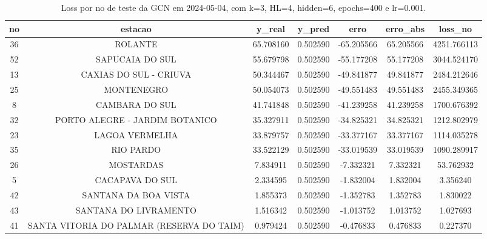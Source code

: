 \begin{table}[h]
\centering
\caption{Loss por no de teste da GCN em 2024-05-04, com k=3, HL=4, hidden=6, epochs=400 e lr=0.001.}
\label{tab:gcn_loss_k3_hl4_h6_e400_d20240504}
\begin{tabular}{ccccccc}
\toprule
no & estacao & y\_real & y\_pred & erro & erro\_abs & loss\_no \\
\midrule
36 & ROLANTE & 65.708160 & 0.502590 & -65.205566 & 65.205566 & 4251.766113 \\
52 & SAPUCAIA DO SUL & 55.679798 & 0.502590 & -55.177208 & 55.177208 & 3044.524170 \\
13 & CAXIAS DO SUL - CRIUVA & 50.344467 & 0.502590 & -49.841877 & 49.841877 & 2484.212646 \\
25 & MONTENEGRO & 50.054073 & 0.502590 & -49.551483 & 49.551483 & 2455.349365 \\
8 & CAMBARA DO SUL & 41.741848 & 0.502590 & -41.239258 & 41.239258 & 1700.676392 \\
32 & PORTO ALEGRE - JARDIM BOTANICO & 35.327911 & 0.502590 & -34.825321 & 34.825321 & 1212.802979 \\
23 & LAGOA VERMELHA & 33.879757 & 0.502590 & -33.377167 & 33.377167 & 1114.035278 \\
35 & RIO PARDO & 33.522129 & 0.502590 & -33.019539 & 33.019539 & 1090.289917 \\
26 & MOSTARDAS & 7.834911 & 0.502590 & -7.332321 & 7.332321 & 53.762932 \\
5 & CACAPAVA DO SUL & 2.334595 & 0.502590 & -1.832004 & 1.832004 & 3.356240 \\
42 & SANTANA DA BOA VISTA & 1.855373 & 0.502590 & -1.352783 & 1.352783 & 1.830022 \\
43 & SANTANA DO LIVRAMENTO & 1.516342 & 0.502590 & -1.013752 & 1.013752 & 1.027693 \\
41 & SANTA VITORIA DO PALMAR (RESERVA DO TAIM) & 0.979424 & 0.502590 & -0.476833 & 0.476833 & 0.227370 \\
\bottomrule
\end{tabular}
\end{table}
